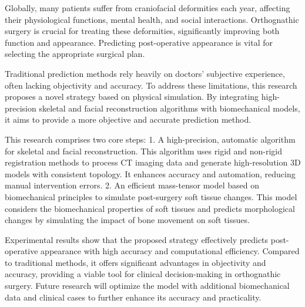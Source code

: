 \begin{abstract*}
  Globally, many patients suffer from craniofacial deformities each year, affecting their physiological functions, mental health, and social interactions. Orthognathic surgery is crucial for treating these deformities, significantly improving both function and appearance. Predicting post-operative appearance is vital for selecting the appropriate surgical plan.

  Traditional prediction methods rely heavily on doctors' subjective experience, often lacking objectivity and accuracy. To address these limitations, this research proposes a novel strategy based on physical simulation. By integrating high-precision skeletal and facial reconstruction algorithms with biomechanical models, it aims to provide a more objective and accurate prediction method.

  This research comprises two core steps: 1. A high-precision, automatic algorithm for skeletal and facial reconstruction. This algorithm uses rigid and non-rigid registration methods to process CT imaging data and generate high-resolution 3D models with consistent topology. It enhances accuracy and automation, reducing manual intervention errors. 2. An efficient mass-tensor model based on biomechanical principles to simulate post-surgery soft tissue changes. This model considers the biomechanical properties of soft tissues and predicts morphological changes by simulating the impact of bone movement on soft tissues.

  Experimental results show that the proposed strategy effectively predicts post-operative appearance with high accuracy and computational efficiency. Compared to traditional methods, it offers significant advantages in objectivity and accuracy, providing a viable tool for clinical decision-making in orthognathic surgery. Future research will optimize the model with additional biomechanical data and clinical cases to further enhance its accuracy and practicality.

\end{abstract*}
